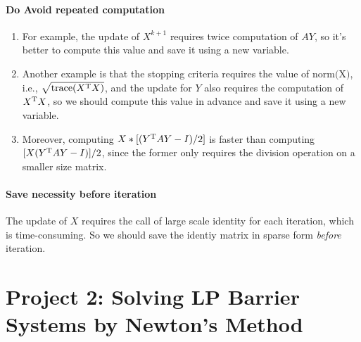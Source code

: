 \paragraph{Do Avoid repeated computation}
\begin{enumerate}
\item
For example, the update of $X^{k+1}$ requires twice computation of $AY$, so it's better to compute this value and save it using a new variable.
\item
Another example is that the stopping criteria requires the value of $\mbox{norm(X)}$, i.e., $\sqrt{\operatorname{trace}(X^{\mathrm T} X)}$, and the update for $Y$ also requires the computation of $X^{\mathrm T} X$, so we should compute this value in advance and save it using a new variable. 
\item
Moreover, computing $X * [(Y^{\mathrm T} AY - I)/2]$ is faster than computing $[X(Y^{\mathrm T} AY - I)]/2$, since the former only requires the division operation on a smaller size matrix.
\end{enumerate} 
\paragraph{Save necessity before iteration}
The update of $X$ requires the call of large scale identity for each iteration, which is time-consuming. So we should save the identiy matrix in sparse form \emph{before} iteration.










\clearpage




\section*{Project 2:
Solving LP Barrier Systems by Newton’s Method}
